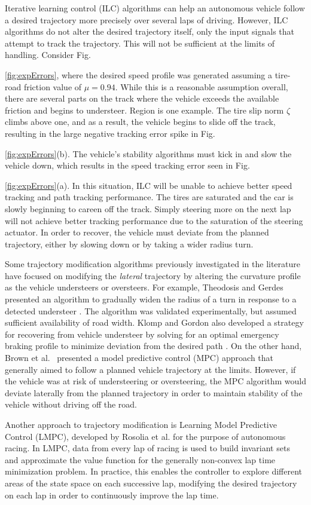 \documentclass[9pt,shortpaper,twoside,web]{ieeecolor}
\newcommand*\circled[1]{\tikz[baseline=(char.base)]{
            \node[shape=circle,draw,inner sep=2pt] (char) {#1};}}
\begin{document}
Iterative learning control (ILC) algorithms can help an autonomous vehicle follow a desired trajectory more precisely over 
several laps of driving. However, ILC algorithms do not alter the desired trajectory itself, only the input signals that attempt
to track the trajectory. This will not be sufficient at the limits of handling. Consider Fig.~{\ref{fig:expErrors}, where the desired speed profile was generated assuming a tire-road friction value of $\mu = 0.94$. While this is a reasonable assumption overall, there are several parts on the track where the vehicle exceeds the available friction and begins to understeer. Region \circled{2} is one example. The tire slip norm $\zeta$ climbs above one, and as a result, the vehicle begins
to slide off the track, resulting in the large negative tracking error spike in Fig.~{\ref{fig:expErrors}(b). The vehicle's stability algorithms must kick in and slow the vehicle down, which results in the speed tracking error seen in Fig.~{\ref{fig:expErrors}(a). In this situation, ILC will be unable to achieve better speed tracking and path tracking performance. The tires are saturated and the car is slowly beginning to careen off the track. Simply steering more
on the next lap will not achieve better tracking performance due to the saturation of the steering actuator. In order to recover, the vehicle must deviate from the planned trajectory, either by slowing down or by taking a wider radius turn. 

Some trajectory modification algorithms previously investigated in
the literature have focused on modifying the \textit{lateral} trajectory by altering the curvature profile as the vehicle understeers or oversteers. For example, Theodosis and Gerdes presented an algorithm to gradually widen the radius of a turn in response to a detected understeer \cite{paulthesis}. The algorithm was validated
experimentally, but assumed sufficient availability of road width. Klomp and Gordon also developed a strategy for recovering from
vehicle understeer by solving for an optimal emergency braking profile to minimize deviation from the desired path \cite{klomp}. On the other hand, Brown et al.~\cite{brown2017safe} presented a model predictive control (MPC) approach that generally aimed to follow a planned vehicle trajectory at the limits. However, if the vehicle was at risk of understeering or oversteering, the MPC algorithm would deviate laterally from the planned trajectory in order to maintain stability of the vehicle without driving off the road. 

Another approach to trajectory modification is Learning Model Predictive Control (LMPC), developed by Rosolia et al. \cite{rosolia2017autonomous} for the purpose of autonomous racing. In LMPC, data from every lap of racing is used to build invariant sets and approximate the value function for the generally non-convex lap time minimization problem. In practice, this enables the controller to explore different areas of the state space on each successive lap, modifying the desired trajectory on each lap in order to continuously improve the lap time.   

}}}
\end{document}
